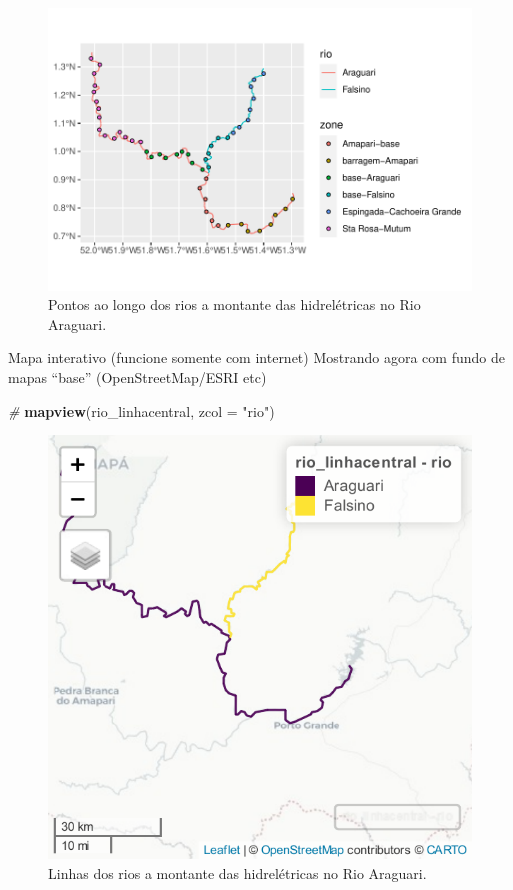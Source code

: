 \documentclass[
]{article}
\newenvironment{Shaded}{\begin{snugshade}}{\end{snugshade}}
\newcommand{\AttributeTok}[1]{\textcolor[rgb]{0.13,0.29,0.53}{#1}}
\newcommand{\CommentTok}[1]{\textcolor[rgb]{0.56,0.35,0.01}{\textit{#1}}}
\newcommand{\FunctionTok}[1]{\textcolor[rgb]{0.13,0.29,0.53}{\textbf{#1}}}
\newcommand{\NormalTok}[1]{#1}
\newcommand{\StringTok}[1]{\textcolor[rgb]{0.31,0.60,0.02}{#1}}
\begin{document}
\begin{figure}
\centering
\includegraphics{epr_files/figure-latex/map-pontod-rio-1.pdf}
\caption{\label{fig:map-pontod-rio}Pontos ao longo dos rios a montante das hidrelétricas no Rio Araguari.}
\end{figure}

Mapa interativo (funcione somente com internet) Mostrando agora com fundo de mapas ``base'' (OpenStreetMap/ESRI etc)

\begin{Shaded}
\begin{Highlighting}[]
\CommentTok{\#}
\FunctionTok{mapview}\NormalTok{(rio\_linhacentral, }\AttributeTok{zcol =} \StringTok{"rio"}\NormalTok{) }
\end{Highlighting}
\end{Shaded}

\begin{figure}
\centering
\includegraphics{epr_files/figure-latex/unnamed-chunk-8-1.pdf}
\caption{\label{fig:unnamed-chunk-8}Linhas dos rios a montante das hidrelétricas no Rio Araguari.}
\end{figure}
\end{document}
